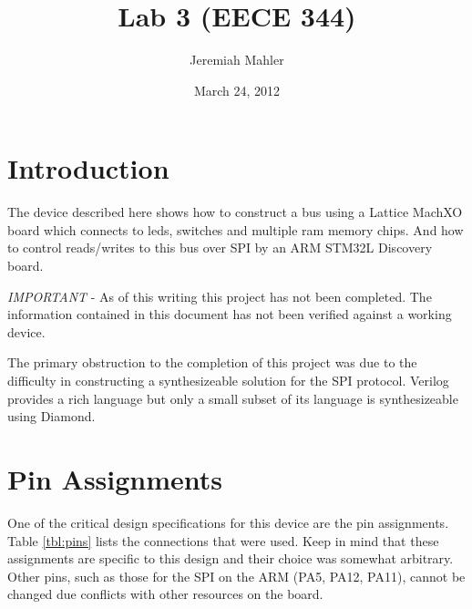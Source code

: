 \documentclass{article}
\begin{document}

\title{Lab 3 (EECE 344)}
\date{March 24, 2012}
\author{Jeremiah Mahler}

\maketitle

\tableofcontents

\pagebreak

\section{Introduction}

The device described here shows how to construct a bus
using a Lattice MachXO\cite{EB66} board which connects
to leds, switches and multiple ram memory chips.
And how to control reads/writes to this bus
over SPI by an ARM STM32L Discovery\cite{UM1079} board.

\emph{IMPORTANT} - As of this writing this project has not
been completed.
The information contained in this document has not been verified
against a working device.

The primary obstruction to the completion of this project
was due to the difficulty in constructing a synthesizeable
solution for the SPI protocol.
Verilog provides a rich language\cite{thomas2002verilog}
but only a small subset of its language is synthesizeable
using Diamond\cite{Diamond}.


\section{Pin Assignments}
\label{sec:pa}

One of the critical design specifications for this device are
the pin assignments.
Table \ref{tbl:pins} lists the connections that were used.
Keep in mind that these assignments are specific to this
design and their choice was somewhat arbitrary.
Other pins, such as those for the SPI on the ARM (PA5, PA12, PA11),
cannot be changed due conflicts with other resources on the board.
\end{document}
